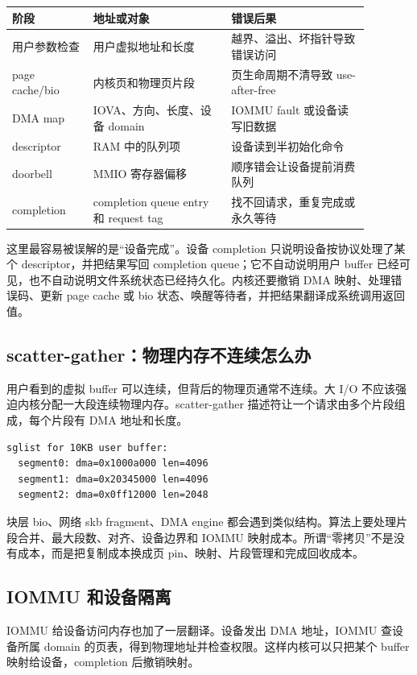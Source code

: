 \begin{longtable}{p{0.20\linewidth}p{0.34\linewidth}p{0.34\linewidth}}
\toprule
阶段 & 地址或对象 & 错误后果 \\
\midrule
用户参数检查 & 用户虚拟地址和长度 & 越界、溢出、坏指针导致错误访问 \\
page cache/bio & 内核页和物理页片段 & 页生命周期不清导致 use-after-free \\
DMA map & IOVA、方向、长度、设备 domain & IOMMU fault 或设备读写旧数据 \\
descriptor & RAM 中的队列项 & 设备读到半初始化命令 \\
doorbell & MMIO 寄存器偏移 & 顺序错会让设备提前消费队列 \\
completion & completion queue entry 和 request tag & 找不回请求，重复完成或永久等待 \\
\bottomrule
\end{longtable}

这里最容易被误解的是“设备完成”。设备 completion 只说明设备按协议处理了某个 descriptor，并把结果写回 completion queue；它不自动说明用户 buffer 已经可见，也不自动说明文件系统状态已经持久化。内核还要撤销 DMA 映射、处理错误码、更新 page cache 或 bio 状态、唤醒等待者，并把结果翻译成系统调用返回值。

\subsection{scatter-gather：物理内存不连续怎么办}

用户看到的虚拟 buffer 可以连续，但背后的物理页通常不连续。大 I/O 不应该强迫内核分配一大段连续物理内存。scatter-gather 描述符让一个请求由多个片段组成，每个片段有 DMA 地址和长度。

\begin{lstlisting}
sglist for 10KB user buffer:
  segment0: dma=0x1000a000 len=4096
  segment1: dma=0x20345000 len=4096
  segment2: dma=0x0ff12000 len=2048
\end{lstlisting}

块层 bio、网络 skb fragment、DMA engine 都会遇到类似结构。算法上要处理片段合并、最大段数、对齐、设备边界和 IOMMU 映射成本。所谓“零拷贝”不是没有成本，而是把复制成本换成页 pin、映射、片段管理和完成回收成本。

\subsection{IOMMU 和设备隔离}

IOMMU 给设备访问内存也加了一层翻译。设备发出 DMA 地址，IOMMU 查设备所属 domain 的页表，得到物理地址并检查权限。这样内核可以只把某个 buffer 映射给设备，completion 后撤销映射。

